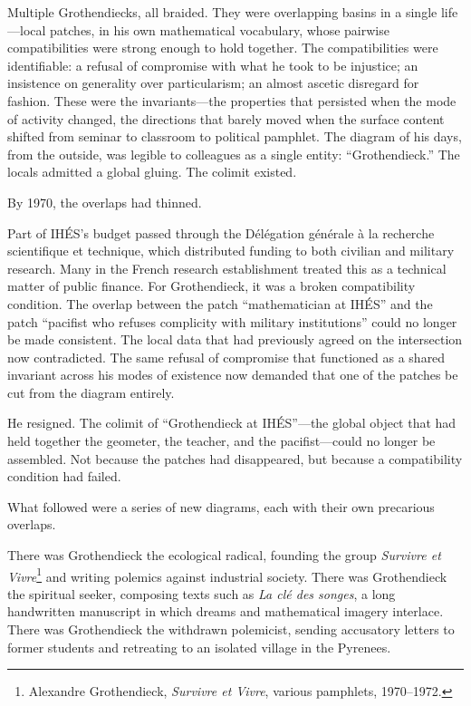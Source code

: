 Multiple Grothendiecks, all braided. They were overlapping basins in a single life---local patches, in his own mathematical vocabulary, whose pairwise compatibilities were strong enough to hold together. The compatibilities were identifiable: a refusal of compromise with what he took to be injustice; an insistence on generality over particularism; an almost ascetic disregard for fashion. These were the invariants---the properties that persisted when the mode of activity changed, the directions that barely moved when the surface content shifted from seminar to classroom to political pamphlet. The diagram of his days, from the outside, was legible to colleagues as a single entity: ``Grothendieck.'' The locals admitted a global gluing. The colimit existed.

By 1970, the overlaps had thinned.

Part of IH\'{E}S's budget passed through the D\'{e}l\'{e}gation g\'{e}n\'{e}rale \`{a} la recherche scientifique et technique, which distributed funding to both civilian and military research. Many in the French research establishment treated this as a technical matter of public finance. For Grothendieck, it was a broken compatibility condition. The overlap between the patch ``mathematician at IH\'{E}S'' and the patch ``pacifist who refuses complicity with military institutions'' could no longer be made consistent. The local data that had previously agreed on the intersection now contradicted. The same refusal of compromise that functioned as a shared invariant across his modes of existence now demanded that one of the patches be cut from the diagram entirely.

He resigned. The colimit of ``Grothendieck at IH\'{E}S''---the global object that had held together the geometer, the teacher, and the pacifist---could no longer be assembled. Not because the patches had disappeared, but because a compatibility condition had failed.

What followed were a series of new diagrams, each with their own precarious overlaps.

There was Grothendieck the ecological radical, founding the group \emph{Survivre et Vivre}\footnote{Alexandre Grothendieck, \emph{Survivre et Vivre}, various pamphlets, 1970--1972.} and writing polemics against industrial society. There was Grothendieck the spiritual seeker, composing texts such as \emph{La cl\'{e} des songes}, a long handwritten manuscript in which dreams and mathematical imagery interlace. There was Grothendieck the withdrawn polemicist, sending accusatory letters to former students and retreating to an isolated village in the Pyrenees.

